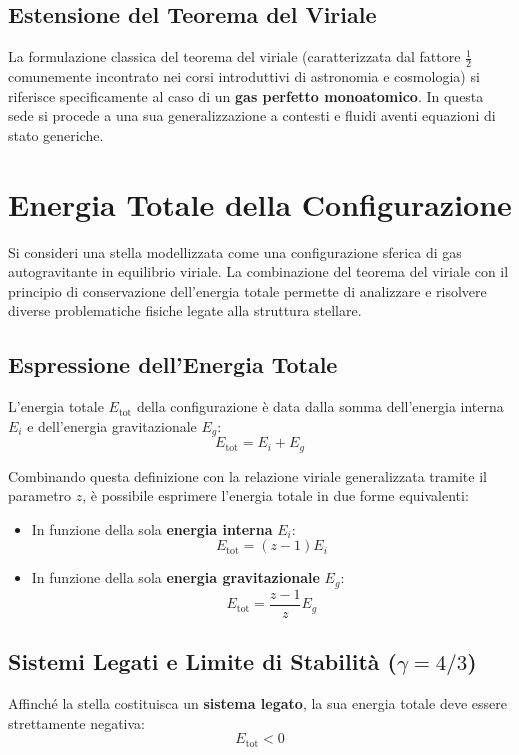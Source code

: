 \subsection{Estensione del Teorema del Viriale}
La formulazione classica del teorema del viriale (caratterizzata dal fattore $\frac{1}{2}$ comunemente incontrato nei corsi introduttivi di astronomia e cosmologia) si riferisce specificamente al caso di un \textbf{gas perfetto monoatomico}. In questa sede si procede a una sua generalizzazione a contesti e fluidi aventi equazioni di stato generiche.

\section{Energia Totale della Configurazione}

Si consideri una stella modellizzata come una configurazione sferica di gas autogravitante in equilibrio viriale. La combinazione del teorema del viriale con il principio di conservazione dell'energia totale permette di analizzare e risolvere diverse problematiche fisiche legate alla struttura stellare.

\subsection{Espressione dell'Energia Totale}
L'energia totale $E_{\text{tot}}$ della configurazione è data dalla somma dell'energia interna $E_i$ e dell'energia gravitazionale $E_g$:
\begin{equation}
E_{\text{tot}} = E_i + E_g
\end{equation}

Combinando questa definizione con la relazione viriale generalizzata tramite il parametro $z$, è possibile esprimere l'energia totale in due forme equivalenti:
\begin{itemize}
\item In funzione della sola \textbf{energia interna} $E_i$:
\begin{equation}
E_{\text{tot}} = (z - 1) E_i
\end{equation}
\item In funzione della sola \textbf{energia gravitazionale} $E_g$:
\begin{equation}
E_{\text{tot}} = \frac{z - 1}{z} E_g
\end{equation}
\end{itemize}

\subsection{Sistemi Legati e Limite di Stabilità ($\gamma = 4/3$)}
Affinché la stella costituisca un \textbf{sistema legato}, la sua energia totale deve essere strettamente negativa:
\begin{equation}
E_{\text{tot}} < 0
\end{equation}

